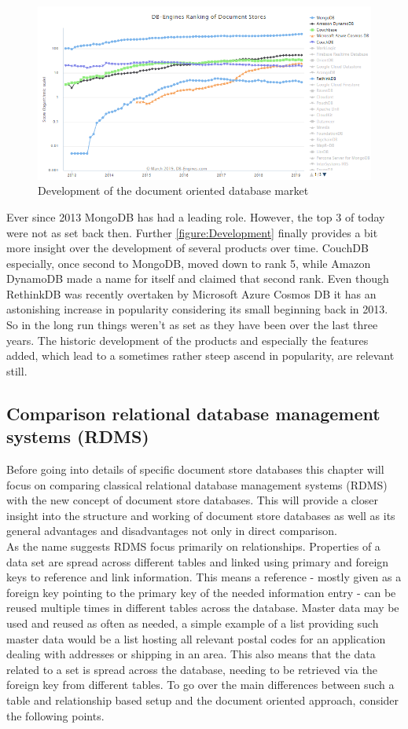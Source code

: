 \begin{figure}
    \centering
    \includegraphics[width=\textwidth]{img/dbRankedTrend.png}
    \caption{Development of the document oriented database market}
    \label{figure:Development}
\end{figure}

Ever since 2013 MongoDB has had a leading role. However, the top 3 of today were not as set back then. Further \autoref{figure:Development} finally provides a bit more insight over the development of several products over time. CouchDB especially, once second to MongoDB, moved down to rank 5, while Amazon DynamoDB made a name for itself and claimed that second rank. Even though RethinkDB was recently overtaken by Microsoft Azure Cosmos DB it has an astonishing increase in popularity considering its small beginning back in 2013. So in the long run things weren't as set as they have been over the last three years. The historic development of the products and especially the features added, which lead to a sometimes rather steep ascend in popularity, are relevant still.

\subsection{Comparison relational database management systems (RDMS)}
\label{section:postalcodes}
Before going into details of specific document store databases this chapter will focus on comparing classical relational database management systems (RDMS) with the new concept of document store databases. This will provide a closer insight into the structure and working of document store databases as well as its general advantages and disadvantages not only in direct comparison.\\
As the name suggests RDMS focus primarily on relationships. Properties of a data set are spread across different tables and linked using primary and foreign keys to reference and link information. This means a reference - mostly given as a foreign key pointing to the primary key of the needed information entry - can be reused multiple times in different tables across the database. Master data may be used and reused as often as needed, a simple example of a list providing such master data would be a list hosting all relevant postal codes for an application dealing with addresses or shipping in an area. This also means that the data related to a set is spread across the database, needing to be retrieved via the foreign key from different tables. To go over the main differences between such a table and relationship based setup and the document oriented approach, consider the following points.
